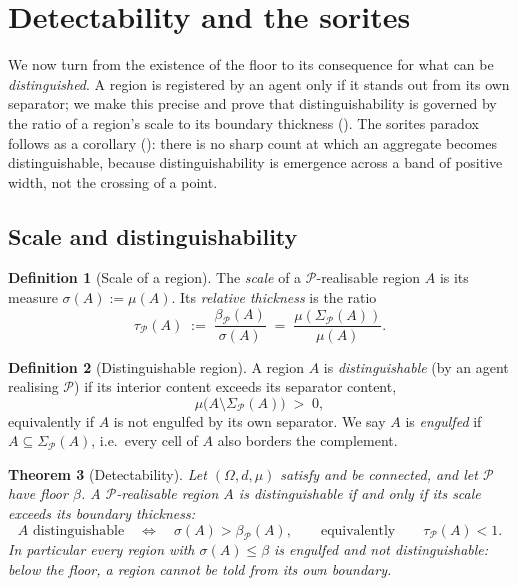 \documentclass[11pt,twocolumn,a4paper]{article}
\theoremstyle{thmstyle}
\newtheorem{theorem}{Theorem}[section]
\theoremstyle{definition}
\newtheorem{definition}[theorem]{Definition}
\theoremstyle{remark}
\newcommand{\Space}{\Omega}
\newcommand{\thick}{\beta}
\newcommand{\Part}{\mathscr{P}}
\begin{document}
\section{Detectability and the sorites}
\label{sec:detect}

We now turn from the existence of the floor to its consequence for what can be
\emph{distinguished}. A region is registered by an agent only if it stands out
from its own separator; we make this precise and prove that distinguishability is
governed by the ratio of a region's scale to its boundary thickness
(). The sorites paradox follows as a corollary
(): there is no sharp count at which an aggregate becomes
distinguishable, because distinguishability is emergence across a band of
positive width, not the crossing of a point.

\subsection{Scale and distinguishability}

\begin{definition}[Scale of a region]
\label{def:scale}
The \emph{scale} of a $\Part$-realisable region $A$ is its measure
$\sigma(A):=\mu(A)$. Its \emph{relative thickness} is the ratio
\[
\tau_\Part(A)\;:=\;\frac{\thick_\Part(A)}{\sigma(A)}
\;=\;\frac{\mu(\Sigma_\Part(A))}{\mu(A)} .
\]
\end{definition}

\begin{definition}[Distinguishable region]
\label{def:distinguishable}
A region $A$ is \emph{distinguishable} \textup{(}by an agent realising
$\Part$\textup{)} if its interior content exceeds its separator content,
\[
\mu\bigl(A\setminus\Sigma_\Part(A)\bigr)\;>\;0,
\]
equivalently if $A$ is not engulfed by its own separator. We say $A$ is
\emph{engulfed} if $A\subseteq\Sigma_\Part(A)$, i.e.\ every cell of $A$ also
borders the complement.
\end{definition}

\begin{theorem}[Detectability]
\label{thm:detectability}
Let $(\Space,d,\mu)$ satisfy  and be connected, and let $\Part$ have
floor $\thick$. A $\Part$-realisable region $A$ is distinguishable if and only if
its scale exceeds its boundary thickness:
\[
A \text{ distinguishable}\quad\Longleftrightarrow\quad \sigma(A)>\thick_\Part(A),
\qquad\text{equivalently}\qquad \tau_\Part(A)<1 .
\]
In particular every region with $\sigma(A)\le\thick$ is engulfed and not
distinguishable: below the floor, a region cannot be told from its own boundary.
\end{theorem}
\end{document}
